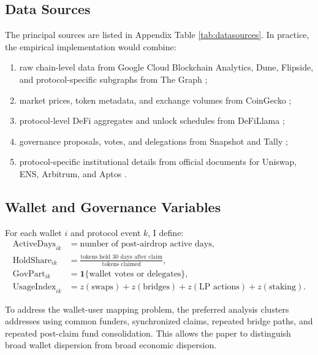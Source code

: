 \documentclass[11pt]{article}
\theoremstyle{remark}
\begin{document}
\subsection{Data Sources}

The principal sources are listed in Appendix Table \ref{tab:datasources}. In practice, the empirical implementation would combine:

\begin{enumerate}[leftmargin=1.5em]
\item raw chain-level data from Google Cloud Blockchain Analytics, Dune, Flipside, and protocol-specific subgraphs from The Graph \citep{bigquery2026blockchain, dune2026docs, flipside2026data, graph2026docs};
\item market prices, token metadata, and exchange volumes from CoinGecko \citep{coingecko2026docs};
\item protocol-level DeFi aggregates and unlock schedules from DeFiLlama \citep{defillama2026api};
\item governance proposals, votes, and delegations from Snapshot and Tally \citep{snapshot2026api, tally2026api};
\item protocol-specific institutional details from official documents for Uniswap, ENS, Arbitrum, and Aptos \citep{uniswap2020uni, ens2026token, arbitrum2023decentralization, aptos2022airdrop}.
\end{enumerate}

\subsection{Wallet and Governance Variables}

For each wallet $i$ and protocol event $k$, I define:
\begin{align}
\text{ActiveDays}_{ik} &= \text{number of post-airdrop active days}, \\
\text{HoldShare}_{ik} &= \frac{\text{tokens held 30 days after claim}}{\text{tokens claimed}}, \\
\text{GovPart}_{ik} &= \mathbf{1}\{\text{wallet votes or delegates}\}, \\
\text{UsageIndex}_{ik} &= z(\text{swaps}) + z(\text{bridges}) + z(\text{LP actions}) + z(\text{staking}).
\end{align}

To address the wallet-user mapping problem, the preferred analysis clusters addresses using common funders, synchronized claims, repeated bridge paths, and repeated post-claim fund consolidation. This allows the paper to distinguish broad wallet dispersion from broad economic dispersion.
\end{document}
